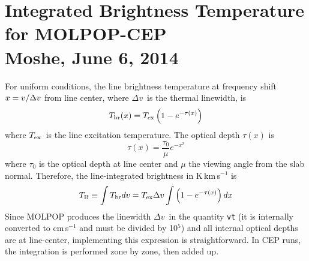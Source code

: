 \documentclass[preprint,12pt]{aastex}
\def\eq#1{\begin{equation} #1 \end{equation}}
\def\Dv       {\hbox{$\Delta v$}}
\def\Tbr      {\hbox{$T_{\rm br}$}}
\def\Tx       {\hbox{$T_{\rm ex}$}}
\def\TB       {\hbox{$T_{\rm B}$}}
\begin{document}
\thispagestyle{empty}

\section*{Integrated Brightness Temperature for MOLPOP-CEP\\
  Moshe, June 6, 2014}


For uniform conditions, the line brightness temperature at frequency shift $x =
v/\Dv$ from line center, where \Dv\ is the thermal linewidth, is
\eq{
   \Tbr(x) = \Tx\left(1 - e^{-\tau(x)}\right)
}
where \Tx\ is the line excitation temperature. The optical depth $\tau(x)$ is
\eq{
   \tau(x) = \frac{\tau_0}{\mu}e^{-x^2}
}
where $\tau_0$ is the optical depth at line center and $\mu$ the viewing angle
from the slab normal. Therefore, the line-integrated brightness in
K\,km\,s$^{-1}$ is
\eq{
  \TB \equiv \int \Tbr dv = \Tx\Dv\int \left(1 - e^{-\tau(x)}\right)dx
}
Since MOLPOP produces the linewidth \Dv\ in the quantity {\tt vt} (it is
internally converted to cm\,s$^{-1}$ and must be divided by 10$^5$) and all
internal optical depths are at line-center, implementing this expression is
straightforward. In CEP runs, the integration is performed zone by zone, then
added up.
\end{document}
